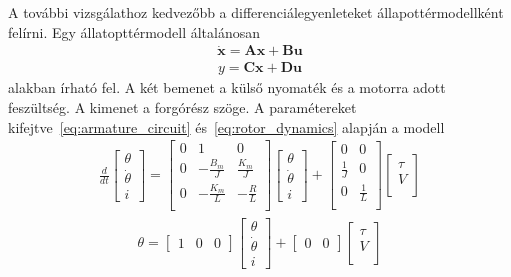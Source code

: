 A további vizsgálathoz kedvezőbb a differenciálegyenleteket állapottérmodellként felírni.
Egy állatopttérmodell általánosan
\begin{align}\label{eq:state_space_generic}
    \dot{\bm x} = \bm A \bm x + \bm B \bm u
\end{align}
\begin{align}\label{eq:state_space_generic_out}
    y = \bm C \bm x + \bm D \bm u
\end{align} 
alakban írható fel. 
A két bemenet a külső nyomaték és a motorra adott feszültség. A kimenet a forgórész szöge.
A paramétereket kifejtve~\ref{eq:armature_circuit} és~\ref{eq:rotor_dynamics} alapján a modell
\begin{align}\label{eq:state_space}
    \frac{d}{dt}
    \begin{bmatrix}
        \theta \\
        \dot\theta \\
        i
    \end{bmatrix}
    =
    \begin{bmatrix}
        0 & 1 & 0 \\
        0 & -\frac{B_m}{J} & \frac{K_m}{J} \\
        0 & -\frac{K_m}{L} & -\frac{R}{L} \\
    \end{bmatrix}
    \begin{bmatrix}
        \theta \\
        \dot\theta \\
        i
    \end{bmatrix}
    +
    \begin{bmatrix}
        0 & 0 \\
        \frac{1}{J} & 0 \\
        0 & \frac{1}{L} \\
    \end{bmatrix}
    \begin{bmatrix}
        \tau \\
        V \\
    \end{bmatrix}
\end{align}
\begin{align}\label{eq:state_space_out}
    \theta = 
    \begin{bmatrix}
        1 & 0 & 0
    \end{bmatrix}
    \begin{bmatrix}
        \theta \\
        \dot\theta \\
        i
    \end{bmatrix}
    +
    \begin{bmatrix}
        0 & 0
    \end{bmatrix}
    \begin{bmatrix}
        \tau \\
        V \\
    \end{bmatrix}
\end{align}
